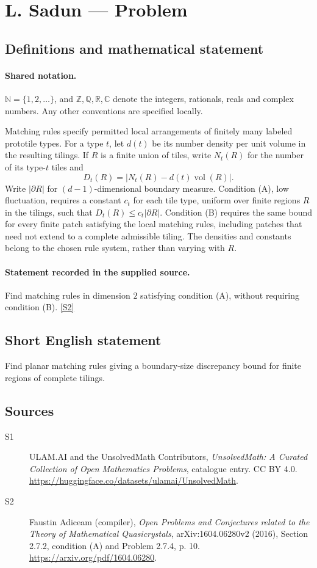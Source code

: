 \documentclass[11pt]{article}
\newcommand{\sref}[2]{\hyperlink{source:#1:#2}{[S#2]}}
\begin{document}
\section{L. Sadun — Problem}\label{statement}

\subsection{Definitions and mathematical statement}

\paragraph{Shared notation.}$\mathbb N=\{1,2,\ldots\}$, and $\mathbb Z,\mathbb Q,\mathbb R,\mathbb C$ denote the integers, rationals, reals and complex numbers. Any other conventions are specified locally.


Matching rules specify permitted local arrangements of finitely many labeled prototile types. For a type $t$, let $d(t)$ be its number density per unit volume in the resulting tilings. If $R$ is a finite union of tiles, write $N_t(R)$ for the number of its type-$t$ tiles and
\[D_t(R)=|N_t(R)-d(t)\operatorname{vol}(R)|.\]
Write $|\partial R|$ for $(d-1)$-dimensional boundary measure. Condition (A), low fluctuation, requires a constant $c_t$ for each tile type, uniform over finite regions $R$ in the tilings, such that $D_t(R)\leq c_t|\partial R|$. Condition (B) requires the same bound for every finite patch satisfying the local matching rules, including patches that need not extend to a complete admissible tiling. The densities and constants belong to the chosen rule system, rather than varying with $R$.
\paragraph{Statement recorded in the supplied source.}
Find matching rules in dimension $2$ satisfying condition (A), without requiring condition (B). \sref{statement}{2}
\subsection{Short English statement}
Find planar matching rules giving a boundary-size discrepancy bound for finite regions of complete tilings.
\subsection{Sources}
\begin{description}
\item[\hypertarget{source:statement:1}{S1}] ULAM.AI and the UnsolvedMath Contributors, \emph{UnsolvedMath: A Curated Collection of Open Mathematics Problems}, catalogue entry. CC BY 4.0. \url{https://huggingface.co/datasets/ulamai/UnsolvedMath}.
\item[\hypertarget{source:statement:2}{S2}] Faustin Adiceam (compiler), \emph{Open Problems and Conjectures related to the Theory of Mathematical Quasicrystals}, arXiv:1604.06280v2 (2016), Section 2.7.2, condition (A) and Problem 2.7.4, p. 10. \url{https://arxiv.org/pdf/1604.06280}.
\end{description}
\label{end:statement}
\end{document}

